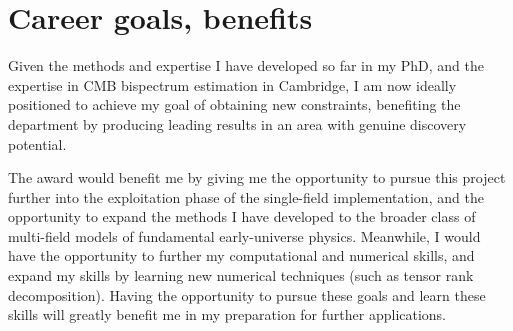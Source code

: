 \section{Career goals, benefits}
Given the methods and expertise I have developed so far in my PhD,
and the expertise in CMB bispectrum estimation in Cambridge, I am now ideally
positioned to achieve my goal of obtaining new constraints,
benefiting the department by producing leading results in an area with genuine discovery potential.

The award would benefit me by giving me the opportunity to pursue this project further
into the exploitation phase of the single-field implementation,
and the opportunity to expand the methods I have developed to the broader class
of multi-field models of fundamental early-universe physics.
Meanwhile, I would have the opportunity to further my computational
and numerical skills, and expand my skills by learning new
numerical techniques (such as tensor rank decomposition).
Having the opportunity to pursue these goals and learn these skills will greatly benefit
me in my preparation for further applications.
